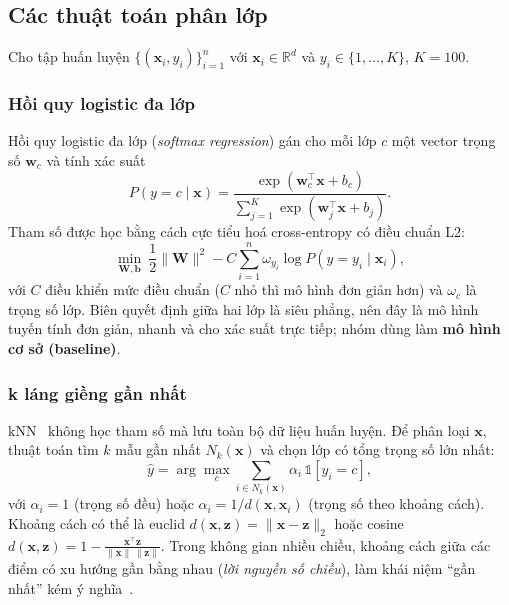 \subsection{Các thuật toán phân lớp}
\label{subsec:classifiers}

Cho tập huấn luyện $\{(\mathbf{x}_i, y_i)\}_{i=1}^n$ với $\mathbf{x}_i\in\mathbb{R}^d$ và $y_i\in\{1,\dots,K\}$, $K=100$.

\subsubsection{Hồi quy logistic đa lớp}
\label{subsubsec:logreg}

Hồi quy logistic đa lớp (\textit{softmax regression}) gán cho mỗi lớp $c$ một vector trọng số $\mathbf{w}_c$ và tính xác suất
\begin{equation}
  P(y=c\mid\mathbf{x}) = \frac{\exp(\mathbf{w}_c^\top\mathbf{x}+b_c)}{\sum_{j=1}^{K}\exp(\mathbf{w}_j^\top\mathbf{x}+b_j)}.
\end{equation}
Tham số được học bằng cách cực tiểu hoá cross-entropy có điều chuẩn L2:
\begin{equation}
  \min_{\mathbf{W},\mathbf{b}}\ \frac{1}{2}\|\mathbf{W}\|^2 - C\sum_{i=1}^{n} \omega_{y_i}\log P(y=y_i\mid\mathbf{x}_i),
\end{equation}
với $C$ điều khiển mức điều chuẩn ($C$ nhỏ thì mô hình đơn giản hơn) và $\omega_c$ là trọng số lớp. Biên quyết định giữa hai lớp là siêu phẳng, nên đây là mô hình tuyến tính đơn giản, nhanh và cho xác suất trực tiếp; nhóm dùng làm \textbf{mô hình cơ sở (baseline)}.

\subsubsection{k láng giềng gần nhất}
\label{subsubsec:knn}

kNN~\cite{han2022} không học tham số mà lưu toàn bộ dữ liệu huấn luyện. Để phân loại $\mathbf{x}$, thuật toán tìm $k$ mẫu gần nhất $N_k(\mathbf{x})$ và chọn lớp có tổng trọng số lớn nhất:
\begin{equation}
  \hat{y} = \arg\max_{c} \sum_{i\in N_k(\mathbf{x})} \alpha_i\,\mathbb{1}[y_i=c],
\end{equation}
với $\alpha_i=1$ (trọng số đều) hoặc $\alpha_i = 1/d(\mathbf{x},\mathbf{x}_i)$ (trọng số theo khoảng cách). Khoảng cách có thể là euclid $d(\mathbf{x},\mathbf{z})=\|\mathbf{x}-\mathbf{z}\|_2$ hoặc cosine $d(\mathbf{x},\mathbf{z}) = 1-\frac{\mathbf{x}^\top\mathbf{z}}{\|\mathbf{x}\|\,\|\mathbf{z}\|}$. Trong không gian nhiều chiều, khoảng cách giữa các điểm có xu hướng gần bằng nhau (\textit{lời nguyền số chiều}), làm khái niệm ``gần nhất'' kém ý nghĩa~\cite{han2022}.

